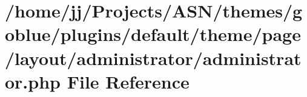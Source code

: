 \hypertarget{theme_2page_2layout_2administrator_2administrator_8php}{}\section{/home/jj/\+Projects/\+A\+S\+N/themes/goblue/plugins/default/theme/page/layout/administrator/administrator.php File Reference}
\label{theme_2page_2layout_2administrator_2administrator_8php}
